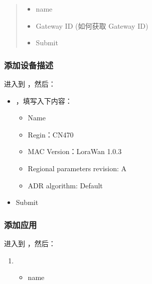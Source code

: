 \documentclass[a4paper,12pt,english]{sphinxmanual}
\begin{document}
{{\begin{quote}
\sphinxAtStartPar
{}
\begin{itemize}
\item {} 
\sphinxAtStartPar
name

\item {} 
\sphinxAtStartPar
Gateway ID (如何获取 Gateway ID)

\item {} 
\sphinxAtStartPar
Submit

\end{itemize}
\end{quote}


\subsubsection{添加设备描述}
\label{\detokenize{exp-lora/lorawan-esp32:id7}}
\sphinxAtStartPar
进入到 ，然后：
\begin{itemize}
\item {} 
\sphinxAtStartPar
{} ，填写入下内容：
\begin{itemize}
\item {} 
\sphinxAtStartPar
Name

\item {} 
\sphinxAtStartPar
Regin：CN470

\item {} 
\sphinxAtStartPar
MAC Version：LoraWan 1.0.3

\item {} 
\sphinxAtStartPar
Regional parameters revision: A

\item {} 
\sphinxAtStartPar
ADR algorithm: Default

\end{itemize}

\item {} 
\sphinxAtStartPar
Submit

\end{itemize}


\subsubsection{添加应用}
\label{\detokenize{exp-lora/lorawan-esp32:id8}}
\sphinxAtStartPar
进入到 ，然后：
\begin{enumerate}
%
\item {} 
\sphinxAtStartPar
{}
\begin{itemize}
\item {} 
\sphinxAtStartPar
name


\end{itemize}
\end{enumerate}}}
\end{document}
